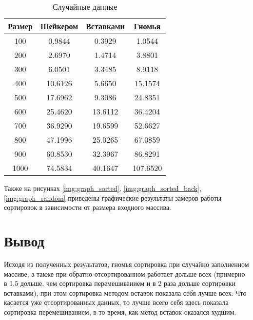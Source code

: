 \begin{table}[h]
	\begin{center}
		\begin{threeparttable}
		\captionsetup{justification=raggedleft,singlelinecheck=off}
		\caption{Случайные данные}
		\label{tbl:random}
		\begin{tabular}{|c|c|c|c|}
			\hline
			 Размер & Шейкером &  Вставками &  Гномья \\
			\hline
			100 & 0.9844 & 0.3929 & 1.0544 \\ 
			\hline
			200 & 2.6970 & 1.4714 & 3.8801 \\ 
			\hline
			300 & 6.0501 & 3.3485 & 8.9118 \\ 
			\hline
			400 & 10.6126 & 5.6650 & 15.1574 \\ 
			\hline
			500 & 17.6962 & 9.3086 & 24.8351 \\ 
			\hline
			600 & 25.4620 & 13.6112 & 36.4204 \\ 
			\hline
			700 & 36.9290 & 19.6599 & 52.6627 \\ 
			\hline
			800 & 47.1996 & 25.0265 & 67.0859 \\ 
			\hline
			900 & 60.8530 & 32.3967 & 86.8291 \\ 
			\hline
			1000 & 74.5834 & 40.1647 & 107.6520 \\ 
			\hline
		\end{tabular}
		\end{threeparttable}
    \end{center}
\end{table}


Также на рисунках \ref{img:graph_sorted}, \ref{img:graph_sorted_back}, \ref{img:graph_random} приведены графические результаты замеров работы сортировок в зависимости от размера входного массива.


\clearpage

\section*{Вывод}
Исходя из полученных результатов, гномья сортировка при случайно заполненном массиве, а также при обратно отсортированном работает дольше всех (примерно в 1.5 дольше, чем сортировка перемешиванием и в 2 раза дольше сортировки вставками), при этом сортировка методом вставок показала себя лучше всех. Что касается уже отсортированных данных, то лучше всего себя здесь показала сортировка перемешиванием, в то время, как метод вставок оказался худшим.